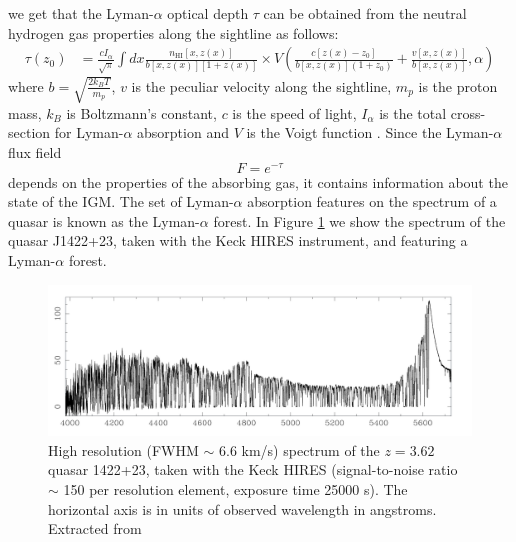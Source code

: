 we get that the Lyman-$\alpha$ optical depth $\tau$ can be obtained from the neutral hydrogen gas properties along the sightline as follows:
\begin{equation}\label{eq:lyman opacity}
    \begin{aligned}\tau(z_0)&=\frac{cI_\alpha}{\sqrt{\pi}}\int dx\frac{n_{\mathrm{HI}}[x,z(x)]}{b[x,z(x)][1+z(x)]}\times V\left(\frac{c[z(x)-z_0]}{b[x,z(x)](1+z_0)}+\frac{v[x,z(x)]}{b[x,z(x)]},\alpha\right)\end{aligned}
\end{equation} 
where $b=\sqrt{\frac{2k_BT}{m_p}}$, $v$ is the peculiar velocity along the sightline, $m_p$ is the proton mass, $k_B$ is Boltzmann's constant, $c$ is the speed of light, $I_\alpha$ is the total cross-section for Lyman-$\alpha$ absorption and $V$ is the Voigt function \cite{Choudhury_2001}. Since the Lyman-$\alpha$ flux field $$F=e^{-\tau}$$ depends on the properties of the absorbing gas, it contains information about the state of the IGM. The set of Lyman-$\alpha$ absorption features on the spectrum of a quasar is known as the Lyman-$\alpha$ forest. In Figure \ref{fig:forest} we show the spectrum of the quasar J1422+23, taken with the Keck HIRES instrument, and featuring a Lyman-$\alpha$ forest.

\begin{figure}[ht]
    \centering
    \includegraphics[width=1\linewidth]{img/ML/forest.png}
    \caption{High resolution (FWHM $\sim$ 6.6 km/s) spectrum of the $z = 3.62$ quasar 1422+23, taken with the Keck HIRES (signal-to-noise ratio $\sim$ 150 per resolution element, exposure time 25000 s). The horizontal axis is in units of observed wavelength in angstroms. Extracted from \cite{Rauch_1998}}
    \label{fig:forest}
\end{figure}


